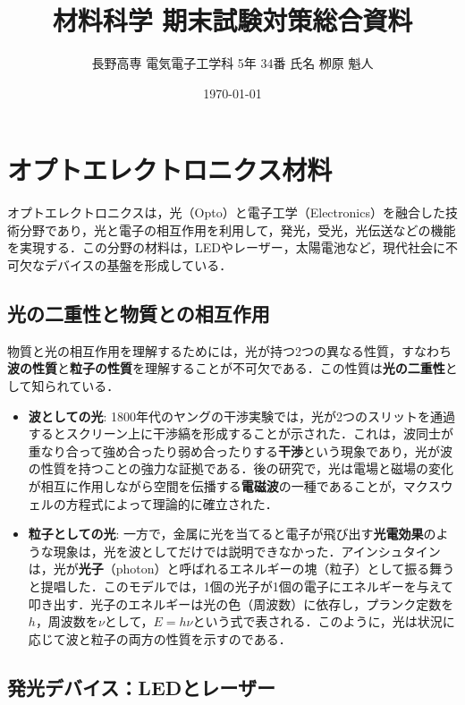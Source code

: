 \documentclass[11pt,a4paper]{ltjsarticle}
\title{材料科学 期末試験対策総合資料}
\author{長野高専 電気電子工学科 5年 34番 氏名 栁原 魁人}
\date{\today}
\newcommand{\supcite}[1]{\textsuperscript{\cite{#1}}}
\begin{document}
\maketitle
\thispagestyle{fancy}

\tableofcontents
\clearpage

\section{オプトエレクトロニクス材料}

オプトエレクトロニクスは，光（Opto）と電子工学（Electronics）を融合した技術分野であり，光と電子の相互作用を利用して，発光，受光，光伝送などの機能を実現する．この分野の材料は，LEDやレーザー，太陽電池など，現代社会に不可欠なデバイスの基盤を形成している\supcite{ref1}．

\subsection{光の二重性と物質との相互作用}

物質と光の相互作用を理解するためには，光が持つ2つの異なる性質，すなわち\textbf{波の性質}と\textbf{粒子の性質}を理解することが不可欠である．この性質は\textbf{光の二重性}として知られている\supcite{ref1}．

\begin{itemize}
\item \textbf{波としての光}: 1800年代のヤングの干渉実験では，光が2つのスリットを通過するとスクリーン上に干渉縞を形成することが示された．これは，波同士が重なり合って強め合ったり弱め合ったりする\textbf{干渉}という現象であり，光が波の性質を持つことの強力な証拠である．後の研究で，光は電場と磁場の変化が相互に作用しながら空間を伝播する\textbf{電磁波}の一種であることが，マクスウェルの方程式によって理論的に確立された\supcite{ref1}．

\item \textbf{粒子としての光}: 一方で，金属に光を当てると電子が飛び出す\textbf{光電効果}のような現象は，光を波としてだけでは説明できなかった．アインシュタインは，光が\textbf{光子}（photon）と呼ばれるエネルギーの塊（粒子）として振る舞うと提唱した．このモデルでは，1個の光子が1個の電子にエネルギーを与えて叩き出す．光子のエネルギーは光の色（周波数）に依存し，プランク定数を$h$，周波数を$\nu$として，$E=h\nu$という式で表される．このように，光は状況に応じて波と粒子の両方の性質を示すのである\supcite{ref1}．
\end{itemize}

\subsection{発光デバイス：LEDとレーザー}
\end{document}
